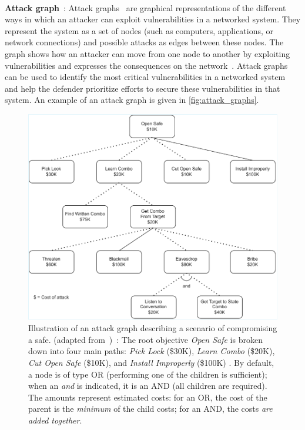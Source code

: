 \

\noindent
\textbf{Attack graph}~: \quad Attack graphs~\cite{CPhilips1998} are graphical representations of the different ways in which an attacker can exploit vulnerabilities in a networked system. They represent the system as a set of nodes (such as computers, applications, or network connections) and possible attacks as edges between these nodes. The graph shows how an attacker can move from one node to another by exploiting vulnerabilities and expresses the consequences on the network~\cite{CPhilips1998}.
Attack graphs can be used to identify the most critical vulnerabilities in a networked system and help the defender prioritize efforts to secure these vulnerabilities in that system. An example of an attack graph is given in \autoref {fig:attack_graphs}.

\begin{figure}[h!]
  \centering
  \includegraphics[width=0.8\linewidth]{figures/attack_graph.pdf}
  \caption[Illustration of an attack graph describing a scenario of compromising a safe.] {Illustration of an attack graph describing a scenario of compromising a safe. (adapted from~\cite{schneier1999modeling})~: The root objective \emph{Open Safe} is broken down into four main paths: \emph{Pick Lock} (\$30K), \emph{Learn Combo} (\$20K), \emph{Cut Open Safe} (\$10K), and \emph{Install Improperly} (\$100K) . By default, a node is of type \textsc{OR} (performing one of the children is sufficient);
    when an \emph{and} is indicated, it is an \textsc{AND} (all children are required). The amounts represent estimated costs: for an \textsc{OR}, the cost of the parent is the \emph{minimum} of the child costs;
    for an \textsc{AND}, the costs \emph{are added together}.}
  \label{fig:attack_graphs}
\end{figure}

